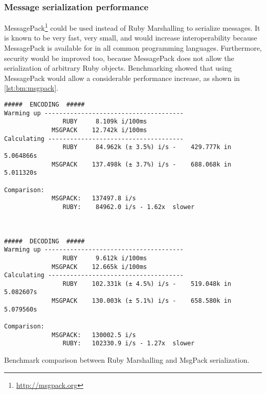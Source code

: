 \subsubsection{Message serialization performance}
MessagePack\footnote{\url{http://msgpack.org}} could be used instead of Ruby
Marshalling to serialize messages. It is known to be very fast, very small, and
would increase interoperability because MessagePack is available for in all
common programming languages. Furthermore, security would be improved too,
because MessagePack does not allow the serialization of arbitrary Ruby objects.
Benchmarking showed that using MessagePack would allow a considerable
performance increase, as shown in \autoref{lst:bm:msgpack}.
\begin{listing}[]
  \begin{verbatim}
#####  ENCODING  #####
Warming up --------------------------------------
                RUBY     8.109k i/100ms
             MSGPACK    12.742k i/100ms
Calculating -------------------------------------
                RUBY     84.962k (± 3.5%) i/s -    429.777k in   5.064866s
             MSGPACK    137.498k (± 3.7%) i/s -    688.068k in   5.011320s

Comparison:
             MSGPACK:   137497.8 i/s
                RUBY:    84962.0 i/s - 1.62x  slower



#####  DECODING  #####
Warming up --------------------------------------
                RUBY     9.612k i/100ms
             MSGPACK    12.665k i/100ms
Calculating -------------------------------------
                RUBY    102.331k (± 4.5%) i/s -    519.048k in   5.082607s
             MSGPACK    130.003k (± 5.1%) i/s -    658.580k in   5.079560s

Comparison:
             MSGPACK:   130002.5 i/s
                RUBY:   102330.9 i/s - 1.27x  slower
  \end{verbatim}
  \caption{Benchmark comparison between Ruby Marshalling and MsgPack serialization.}
  \label{lst:bm:msgpack}
\end{listing}

